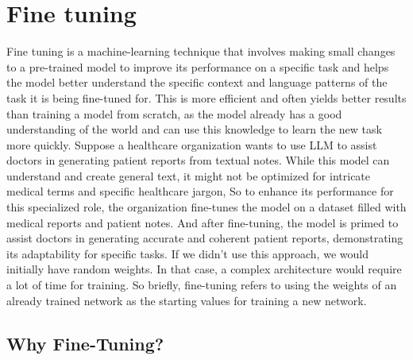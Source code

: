 \section{Fine tuning} %
\cite{Fine-Tune}
Fine tuning is a machine-learning technique that involves making small changes to a pre-trained model to improve its performance on a specific task and helps the model better understand the specific context and language patterns of the task it is being fine-tuned for. This is more efficient and often yields better results than training a model from scratch, as the model already has a good understanding of the world and can use this knowledge to learn the new task more quickly. 
Suppose a healthcare organization wants to use LLM to assist doctors in generating patient reports from textual notes. While this model can understand and create general text, it might not be optimized for intricate medical terms and specific healthcare jargon, So to enhance its performance for this specialized role, the organization fine-tunes the model on a dataset filled with medical reports and patient notes.
And after fine-tuning, the model is primed to assist doctors in generating accurate and coherent patient reports, demonstrating its adaptability for specific tasks.
If we didn’t use this approach, we would initially have random weights. In that case, a complex architecture would require a lot of time for training.
So briefly, fine-tuning refers to using the weights of an already trained network as the starting values for training a new network.


\subsection{Why Fine-Tuning?} %

